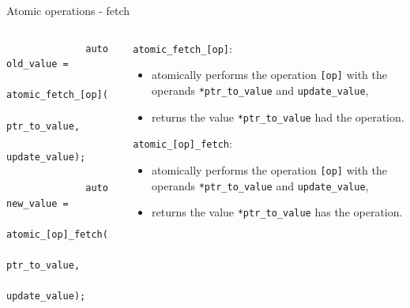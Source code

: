 \documentclass[
    aspectratio=169,
    handout,
]{beamer}
\begin{document}
\begin{frame}[fragile]{Atomic operations - fetch}
    \begin{columns}
        \begin{column}{0.4\linewidth}
            \begin{verbatim}
              auto old_value =
                atomic_fetch_[op](
                  ptr_to_value,
                  update_value);

              auto new_value =
                atomic_[op]_fetch(
                  ptr_to_value,
                  update_value);
            \end{verbatim}
        \end{column}
        \begin{column}{0.6\linewidth}
          \texttt{atomic\_fetch\_[op]}:
          \begin{itemize}
            \item atomically performs the operation \texttt{[op]} with the operands \texttt{*ptr\_to\_value} and \texttt{update\_value},
            \item returns the value \texttt{*ptr\_to\_value} had  the operation.
          \end{itemize}
          \texttt{atomic\_[op]\_fetch}:
          \begin{itemize}
            \item atomically performs the operation \texttt{[op]} with the operands \texttt{*ptr\_to\_value} and \texttt{update\_value},
            \item returns the value \texttt{*ptr\_to\_value} has  the operation.
          \end{itemize}
        \end{column}
    \end{columns}
\end{frame}
\end{document}
